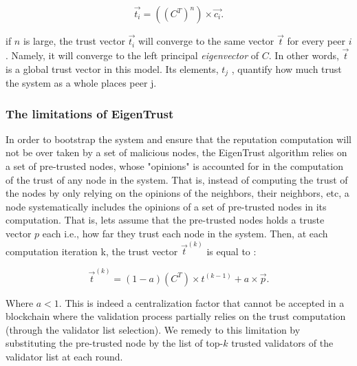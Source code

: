 \documentclass[]{article}
\begin{document}
\begin{equation}
   \vec{t_i} = ((C^T)^n) \times \vec{c_i}. 
\end{equation}

if $n$ is large, the trust vector  $\vec{t_i}$ will converge to the same vector $\vec{t}$ for every peer $i$. Namely, it will converge to the left principal \textit{eigenvector} of $C$. In other words, $\vec{t}$ is a global trust vector in this model. Its elements, $t_j$ , quantify how much trust the system as a whole places peer j.

\subsubsection{The limitations of EigenTrust}
In order to bootstrap the system and ensure that the reputation computation will not be over taken by a set of malicious nodes, the EigenTrust algorithm relies on a set of pre-trusted nodes, whose "opinions" is accounted for in the computation of the trust of any node in the system. That is, instead of computing the trust of the nodes by only relying on the opinions of the neighbors, their neighbors, etc, a node systematically includes the opinions of a set of pre-trusted nodes in its computation. That is, lets assume that the pre-trusted nodes holds a truste vector $p$ each i.e., how far they trust each node in the system. Then, at each computation iteration k, the trust vector $\vec{t}^{(k)}$ is equal to : 

\begin{equation}
   \vec{t}^{(k)} = (1 - a)(C^T) \times t^{(k-1)} + a \times \vec{p}.
\end{equation}

Where $a < 1$. This is indeed a centralization factor that cannot be accepted in a blockchain where the validation process partially relies on the trust computation (through the validator list selection). We remedy to this limitation by substituting the pre-trusted node by the list of top-$k$ trusted validators of the validator list at each round. 
\end{document}
